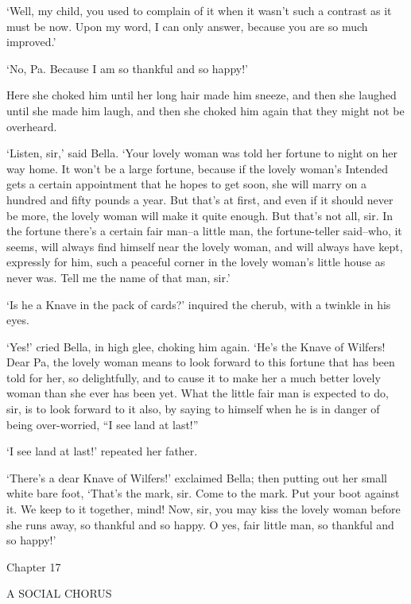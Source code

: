‘Well, my child, you used to complain of it when it wasn’t such a
contrast as it must be now. Upon my word, I can only answer, because you
are so much improved.’

‘No, Pa. Because I am so thankful and so happy!’

Here she choked him until her long hair made him sneeze, and then she
laughed until she made him laugh, and then she choked him again that
they might not be overheard.

‘Listen, sir,’ said Bella. ‘Your lovely woman was told her fortune
to night on her way home. It won’t be a large fortune, because if the
lovely woman’s Intended gets a certain appointment that he hopes to get
soon, she will marry on a hundred and fifty pounds a year. But that’s at
first, and even if it should never be more, the lovely woman will make
it quite enough. But that’s not all, sir. In the fortune there’s a
certain fair man--a little man, the fortune-teller said--who, it seems,
will always find himself near the lovely woman, and will always have
kept, expressly for him, such a peaceful corner in the lovely woman’s
little house as never was. Tell me the name of that man, sir.’

‘Is he a Knave in the pack of cards?’ inquired the cherub, with a
twinkle in his eyes.

‘Yes!’ cried Bella, in high glee, choking him again. ‘He’s the Knave of
Wilfers! Dear Pa, the lovely woman means to look forward to this fortune
that has been told for her, so delightfully, and to cause it to make her
a much better lovely woman than she ever has been yet. What the little
fair man is expected to do, sir, is to look forward to it also, by
saying to himself when he is in danger of being over-worried, “I see
land at last!”

‘I see land at last!’ repeated her father.

‘There’s a dear Knave of Wilfers!’ exclaimed Bella; then putting out her
small white bare foot, ‘That’s the mark, sir. Come to the mark. Put your
boot against it. We keep to it together, mind! Now, sir, you may kiss
the lovely woman before she runs away, so thankful and so happy. O yes,
fair little man, so thankful and so happy!’



Chapter 17

A SOCIAL CHORUS


